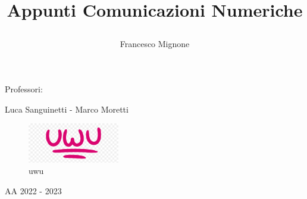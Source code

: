 \title{\bf Appunti Comunicazioni Numeriche \par}
\author{Francesco Mignone}
\date{}
\begin{titlepage}

    \maketitle    

    \begin{center}
        Professori:


        Luca Sanguinetti - Marco Moretti

        \vfill
        \begin{figure}[htp]
            \centering
            \includegraphics[width=4cm]{media/uwu.png}
            \caption{uwu}
            \label{fig:uwu}
        \end{figure}
        AA 2022 - 2023
    \end{center}

\end{titlepage}

